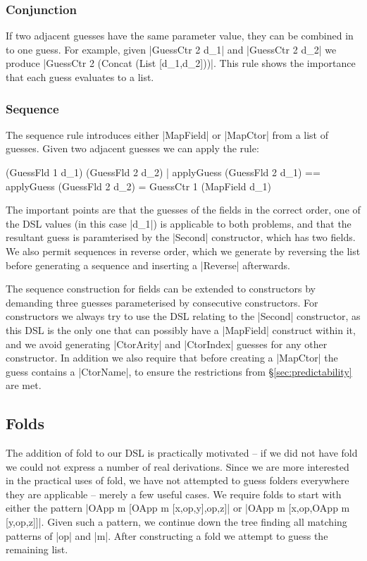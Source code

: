 \documentclass[preprint,draft]{sigplanconf}
\begin{document}
\subsubsection{Conjunction}

If two adjacent guesses have the same parameter value, they can be combined in to one guess. For example, given |GuessCtr 2 d_1| and |GuessCtr 2 d_2| we produce |GuessCtr 2 (Concat (List [d_1,d_2]))|. This rule shows the importance that each guess evaluates to a list.

\subsubsection{Sequence}
\label{sec:guess_lists_sequence}

The sequence rule introduces either |MapField| or |MapCtor| from a list of guesses. Given two adjacent guesses we can apply the rule:

\ignore\begin{code}
(GuessFld 1 d_1) (GuessFld 2 d_2)
    | applyGuess (GuessFld 2 d_1) == applyGuess (GuessFld 2 d_2)
    = GuessCtr 1 (MapField d_1)
\end{code}

The important points are that the guesses of the fields in the correct order, one of the DSL values (in this case |d_1|) is applicable to both problems, and that the resultant guess is paramterised by the |Second| constructor, which has two fields. We also permit sequences in reverse order, which we generate by reversing the list before generating a sequence and inserting a |Reverse| afterwards.

The sequence construction for fields can be extended to constructors by demanding three guesses parameterised by consecutive constructors. For constructors we always try to use the DSL relating to the |Second| constructor, as this DSL is the only one that can possibly have a |MapField| construct within it, and we avoid generating |CtorArity| and |CtorIndex| guesses for any other constructor. In addition we also require that before creating a |MapCtor| the guess contains a |CtorName|, to ensure the restrictions from \S\ref{sec:predictability} are met.

\subsection{Folds}

The addition of fold to our DSL is practically motivated -- if we did not have fold we could not express a number of real derivations. Since we are more interested in the practical uses of fold, we have not attempted to guess folders everywhere they are applicable -- merely a few useful cases. We require folds to start with either the pattern |OApp m [OApp m [x,op,y],op,z]| or |OApp m [x,op,OApp m [y,op,z]]|. Given such a pattern, we continue down the tree finding all matching patterns of |op| and |m|. After constructing a fold we attempt to guess the remaining list.
\end{document}
